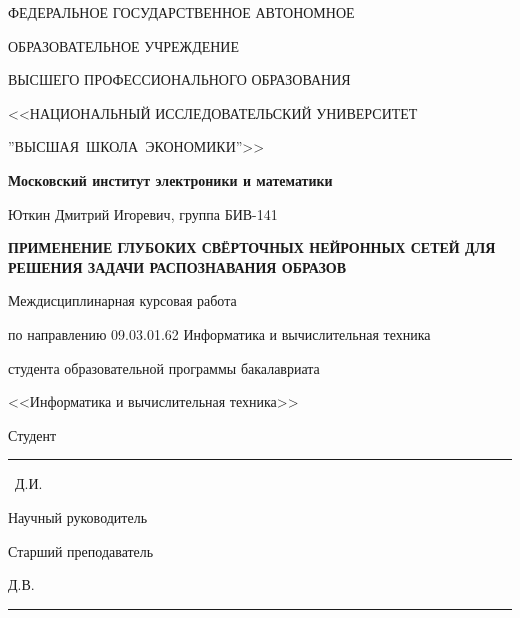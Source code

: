 \begin{titlepage}
    \begin{center}
        ФЕДЕРАЛЬНОЕ ГОСУДАРСТВЕННОЕ АВТОНОМНОЕ
        
        ОБРАЗОВАТЕЛЬНОЕ УЧРЕЖДЕНИЕ
        
        ВЫСШЕГО ПРОФЕССИОНАЛЬНОГО ОБРАЗОВАНИЯ
        
       <<НАЦИОНАЛЬНЫЙ ИССЛЕДОВАТЕЛЬСКИЙ УНИВЕРСИТЕТ
       
       ''ВЫСШАЯ~ШКОЛА~ЭКОНОМИКИ''>>
       \vspace{1cm}
 
        \textbf{Московский институт электроники и математики}
        
        Юткин Дмитрий Игоревич, группа БИВ-141
        \vspace{1cm}
        
        \textbf{\MakeUppercase{Применение глубоких свёрточных нейронных сетей для решения задачи распознавания образов}}
        \vspace{1cm}

        Междисциплинарная курсовая работа
        
        по направлению 09.03.01.62 Информатика и вычислительная техника 

        студента образовательной программы бакалавриата
        
        <<Информатика и вычислительная техника>>
        
    \end{center}
    \begin{flushright}
        Студент~\rule{4cm}{.1pt}~Д.И.
        \vspace{1cm}
        
        Научный руководитель

        Старший преподаватель

        Д.В.
        
        \rule{4cm}{.1pt}
    \end{flushright}
    \vfill{}
\end{titlepage}